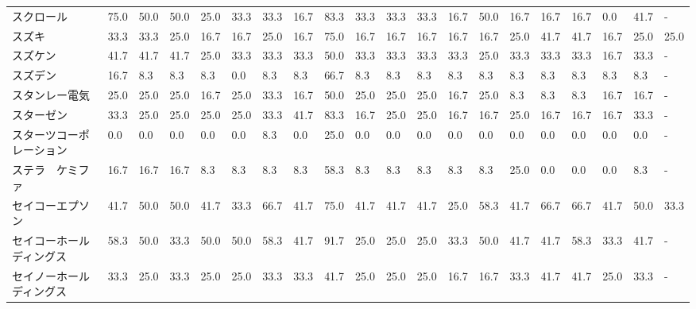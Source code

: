 \begin{tabular}{llllllllllllllllllll}
スクロール           &   75.0 &   50.0 &      50.0 &      25.0 &       33.3 &   33.3 &   16.7 &   83.3 &    33.3 &    33.3 &   33.3 &  16.7 &   50.0 &    16.7 &    16.7 &  16.7 &   0.0 &  41.7 &     - \\
スズキ             &   33.3 &   33.3 &      25.0 &      16.7 &       16.7 &   25.0 &   16.7 &   75.0 &    16.7 &    16.7 &   16.7 &  16.7 &   16.7 &    25.0 &    41.7 &  41.7 &  16.7 &  25.0 &  25.0 \\
スズケン            &   41.7 &   41.7 &      41.7 &      25.0 &       33.3 &   33.3 &   33.3 &   50.0 &    33.3 &    33.3 &   33.3 &  33.3 &   25.0 &    33.3 &    33.3 &  33.3 &  16.7 &  33.3 &     - \\
スズデン            &   16.7 &    8.3 &       8.3 &       8.3 &        0.0 &    8.3 &    8.3 &   66.7 &     8.3 &     8.3 &    8.3 &   8.3 &    8.3 &     8.3 &     8.3 &   8.3 &   8.3 &   8.3 &     - \\
スタンレー電気         &   25.0 &   25.0 &      25.0 &      16.7 &       25.0 &   33.3 &   16.7 &   50.0 &    25.0 &    25.0 &   25.0 &  16.7 &   25.0 &     8.3 &     8.3 &   8.3 &  16.7 &  16.7 &     - \\
スターゼン           &   33.3 &   25.0 &      25.0 &      25.0 &       25.0 &   33.3 &   41.7 &   83.3 &    16.7 &    25.0 &   25.0 &  16.7 &   16.7 &    25.0 &    16.7 &  16.7 &  16.7 &  33.3 &     - \\
スターツコーポレーション    &    0.0 &    0.0 &       0.0 &       0.0 &        0.0 &    8.3 &    0.0 &   25.0 &     0.0 &     0.0 &    0.0 &   0.0 &    0.0 &     0.0 &     0.0 &   0.0 &   0.0 &   0.0 &     - \\
ステラ　ケミファ        &   16.7 &   16.7 &      16.7 &       8.3 &        8.3 &    8.3 &    8.3 &   58.3 &     8.3 &     8.3 &    8.3 &   8.3 &    8.3 &    25.0 &     0.0 &   0.0 &   0.0 &   8.3 &     - \\
セイコーエプソン        &   41.7 &   50.0 &      50.0 &      41.7 &       33.3 &   66.7 &   41.7 &   75.0 &    41.7 &    41.7 &   41.7 &  25.0 &   58.3 &    41.7 &    66.7 &  66.7 &  41.7 &  50.0 &  33.3 \\
セイコーホールディングス    &   58.3 &   50.0 &      33.3 &      50.0 &       50.0 &   58.3 &   41.7 &   91.7 &    25.0 &    25.0 &   25.0 &  33.3 &   50.0 &    41.7 &    41.7 &  58.3 &  33.3 &  41.7 &     - \\
セイノーホールディングス    &   33.3 &   25.0 &      33.3 &      25.0 &       25.0 &   33.3 &   33.3 &   41.7 &    25.0 &    25.0 &   25.0 &  16.7 &   16.7 &    33.3 &    41.7 &  41.7 &  25.0 &  33.3 &     - \\

\end{tabular}
